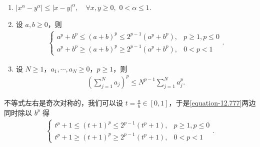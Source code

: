 \documentclass[../../main.tex]{subfiles}%
\begin{document}
\begin{proposition}[凸性不等式]\label{proposition:凸性不等式}
\begin{enumerate}[(1)]
\item\label{proposition:凸性不等式-1} $\left| x^{\alpha}-y^{\alpha} \right|\leqslant \left| x-y \right|^{\alpha},\quad \forall x,y\geqslant 0,\,\,0<\alpha \leqslant 1.$

\item\label{proposition:凸性不等式-2} 设 \(a,b\geqslant0\)，则
\begin{align}\label{equation-12.777}
\begin{cases}
a^p + b^p\leqslant(a + b)^p\leqslant2^{p - 1}(a^p + b^p),& p\geqslant1,p\leqslant0\\
a^p + b^p\geqslant(a + b)^p\geqslant2^{p - 1}(a^p + b^p),& 0 < p < 1
\end{cases}.
\end{align}

\item\label{proposition:凸性不等式-3} 设 $N\geqslant1$，$a_1,\cdots,a_N\geqslant0$，$p\geqslant1$，则
\begin{align}\label{equation-12.778}
\left(\sum\limits_{j=1}^{N}a_j\right)^{p}
\leqslant
N^{p-1}\sum\limits_{j=1}^{N}a_j^{p}.
\end{align}
\end{enumerate}
\end{proposition}
\begin{note}
不等式左右是奇次对称的，我们可以设 $t = \frac{a}{b}\in[0,1]$，于是\eqref{equation-12.777}两边同时除以 $b^p$ 得
\begin{align*}
\begin{cases}
t^p + 1\leqslant(t + 1)^p\leqslant2^{p - 1}(t^p + 1),& p\geqslant1,p\leqslant0\\
t^p + 1\geqslant(t + 1)^p\geqslant2^{p - 1}(t^p + 1),& 0 < p < 1
\end{cases}.
\end{align*}
\end{note}
\end{document}
